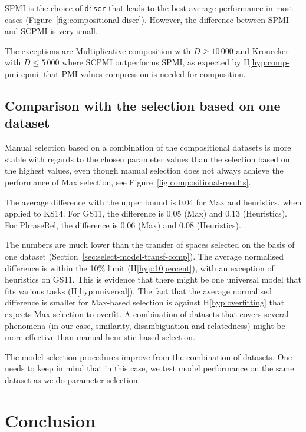 



SPMI is the choice of \texttt{discr} that leads to the best average performance in most cases (Figure~\ref{fig:compositional-discr}). However, the difference between SPMI and SCPMI is very small.

The exceptions are Multiplicative composition with $D \geq 10\,000$ and Kronecker with $D \leq 5\,000$ where SCPMI outperforms SPMI, as expected by H\ref{hyp:comp-pmi-cpmi} that PMI values compression is needed for composition.

\subsection{Comparison with the selection based on one dataset}
\label{sec:comp-with-single-comp}

Manual selection based on a combination of the compositional datasets is more stable with regards to the chosen parameter values than the selection based on the highest values, even though manual selection does not always achieve the performance of Max selection, see Figure~\ref{fig:compositional-results}.

The average difference with the upper bound is 0.04 for Max and heuristics, when applied to KS14. For GS11, the difference is 0.05 (Max) and 0.13 (Heuristics). For PhraseRel, the difference is 0.06 (Max) and 0.08 (Heuristics).

The numbers are much lower than the transfer of spaces selected on the basis of one dataset (Section~\ref{sec:select-model-transf-comp}). The average normalised difference is within the 10\% limit (H\ref{hyp:10percent}), with an exception of heuristics on GS11. This is evidence that there might be one universal model that fits various tasks (H\ref{hyp:universal}). The fact that the average normalised difference is smaller for Max-based selection is against H\ref{hyp:overfitting} that expects Max selection to overfit. A combination of datasets that covers several phenomena (in our case, similarity, disambiguation and relatedness) might be more effective than manual heuristic-based selection.

The model selection procedures improve from the combination of datasets. One needs to keep in mind that in this case, we test model performance on the same dataset as we do parameter selection.

\section{Conclusion}
\label{sec:conclusion-comp}

